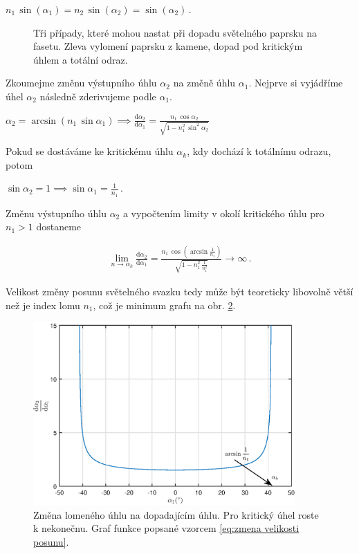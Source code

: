 \begin{center}
$n_1\,\sin(\alpha_1) = n_2\,\sin(\alpha_2) = \sin(\alpha_2)\,.$
\end{center}

\begin{figure}[h!]
\begin{center}
\scalebox{.9}{ }
\end{center}
\caption{Tři případy, které mohou nastat při dopadu světelného paprsku na fasetu. Zleva vylomení paprsku z kamene, dopad pod kritickým úhlem a totální odraz.}
\label{fig:lom ven }
\end{figure}

Zkoumejme změnu výstupního úhlu $\alpha_2$ na změně úhlu $\alpha_1$. Nejprve si vyjádříme úhel $\alpha_2$ následně zderivujeme podle $\alpha_1$. 

\begin{center}
$\alpha_2 = \arcsin(n_1\,\sin\alpha_1) \implies \frac{\mathrm{d}\alpha_2}{\mathrm{d}\alpha_1}= \frac{n_1\,\cos\alpha_2}{\sqrt{1-n_1^2\,\sin^2\alpha_2}}$
\end{center}

Pokud se dostáváme ke kritickému úhlu $\alpha_k$, kdy dochází k totálnímu odrazu, potom

\begin{center}
 $	\sin\alpha_2 = 1 \implies \sin\alpha_1 = \frac{1}{n_1}\,. $
\end{center}

Změnu výstupního úhlu $\alpha_2$ a vypočtením limity v okolí kritického úhlu pro $ n_1>1$ dostaneme 

\begin{eqnarray}
\lim_{n \to \alpha_k}\frac{\mathrm{d}\alpha_2}{\mathrm{d}\alpha_1} = \frac{n_1\,\cos(\arcsin\frac{1}{n_1})}{\sqrt{1-n_1^2\,\frac{1}{n_1^2}}} \to \infty\,.
\label{eq:zmena velikosti posunu}  
\end{eqnarray}

Velikost změny posunu světelného svazku tedy může být teoreticky libovolně větší než je index lomu $n_1$, což je minimum grafu na obr. \ref{fig:derivace uhlu}. 

\begin{figure}
\begin{center}
\includegraphics[width = 10cm]{figures/derivace.eps}
\end{center}
\caption{Změna lomeného úhlu na dopadajícím úhlu. Pro kritický úhel roste k nekonečnu. Graf funkce popsané vzorcem \ref{eq:zmena velikosti posunu}.}
\label{fig:derivace uhlu}
\end{figure}
\newpage


